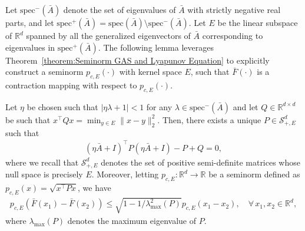 \documentclass[11 pt]{article}
\begin{document}
	Let $\text{spec}^-(\bar{A})$ denote the set of eigenvalues of $\bar{A}$ with strictly negative real parts, and let $\text{spec}^+(\bar{A}) = \text{spec}(\bar{A}) \setminus \text{spec}^-(\bar{A})$. Let $E$ be the linear subspace of $\mathbb{R}^d$ spanned by all the generalized eigenvectors of $\bar{A}$ corresponding to eigenvalues in $\text{spec}^+(\bar{A})$. The following lemma leverages Theorem~\ref{theorem:Seminorm GAS and Lyapunov Equation} to explicitly construct a seminorm $p_{c,E}(\cdot)$ with kernel space $E$, such that $\bar{F}(\cdot)$ is a contraction mapping with respect to $p_{c,E}(\cdot)$.
	
	
	
	\begin{lemma}\label{le:lsa_contraction}
		Let $\eta$ be chosen such that $|\eta \lambda+1|<1$ for any $\lambda\in \text{spec}^-(\bar{A})$ and let $Q\in\mathbb{R}^{d\times d}$ be such that $x^\top Qx = \min_{y \in E} \|x - y\|_2^2$. Then, there exists a unique $P\in \mathcal{S}^{d}_{+,E}$ such that 
		\begin{align}\label{eq:lyap_eq}
			(\eta \bar{A}+I)^\top P(\eta \bar{A}+I)-P+Q=0,
		\end{align}
		where we recall that $\mathcal{S}^d_{+,E}$ denotes the set of positive semi-definite matrices whose null space is precisely $E$.
		Moreover, letting $p_{c,E}:\mathbb{R}^d\to \mathbb{R}$ be a seminorm defined as $p_{c,E}(x)=\sqrt{x^\top Px}$, we have
		\begin{align*}
			p_{c,E}(\bar{F}(x_1)-\bar{F}(x_2))\leq \sqrt{1-1/\lambda_{\max}^2(P)}p_{c,E}(x_1-x_2),\quad \forall\,x_1,x_2\in\mathbb{R}^d,
		\end{align*}
		where $\lambda_{\max}(P)$ denotes the maximum eigenvalue of $P$. 
	\end{lemma}
\end{document}
